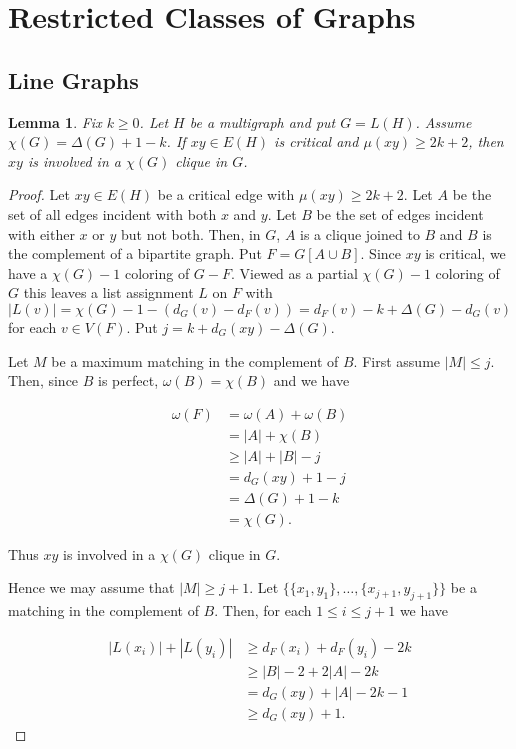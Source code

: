 \documentclass[12pt]{article}
\theoremstyle{plain}
\newtheorem{lem}[thm]{Lemma}
\theoremstyle{definition}
\theoremstyle{remark}
\begin{document}
\section{Restricted Classes of Graphs}
\subsection{Line Graphs}
\begin{lem}\label{muBoundLemma}
Fix $k \geq 0$. Let $H$ be a multigraph and put $G = L(H)$.  Assume $\chi(G) = \Delta(G) + 1 - k$. If $xy \in E(H)$ is critical and $\mu(xy) \geq 2k + 2$, then $xy$ is involved in a $\chi(G)$ clique in $G$.
\end{lem}
\begin{proof}
Let $xy \in E(H)$ be a critical edge with $\mu(xy) \geq 2k + 2$.  Let $A$ be the set of all edges incident with both $x$ and $y$.  Let $B$ be the set of edges incident with either $x$ or $y$ but not both.  Then, in $G$, $A$ is a clique joined to $B$ and $B$ is the complement of a bipartite graph.  Put $F = G[A \cup B]$.  Since $xy$ is critical, we have a $\chi(G) - 1$ coloring of $G - F$.  Viewed as a partial $\chi(G) - 1$ coloring of $G$ this leaves a list assignment $L$ on $F$ with 
$|L(v)| = \chi(G) - 1 - (d_G(v) - d_F(v)) = d_F(v) - k + \Delta(G) - d_G(v)$ for each $v \in V(F)$.  Put $j = k + d_G(xy) - \Delta(G)$. \newline

Let $M$ be a maximum matching in the complement of $B$.  First assume $|M| \leq j$.  Then, since $B$ is perfect, $\omega(B) = \chi(B)$ and we have

\begin{align*}
\omega(F) &= \omega(A) + \omega(B) \\ 
&= |A| + \chi(B) \\
&\geq |A| + |B| - j \\
&= d_G(xy) + 1 - j \\
&= \Delta(G) + 1 - k \\
&= \chi(G).
\end{align*}

Thus $xy$ is involved in a $\chi(G)$ clique in $G$.\newline

Hence we may assume that $|M| \geq j + 1$.  Let $\{\{x_1, y_1\}, \ldots, \{x_{j+1}, y_{j+1}\}\}$ be a matching in the complement of $B$.  Then, for each $1 \leq i \leq j + 1$ we have

\begin{align*}
|L(x_i)| + |L(y_i)| &\geq d_F(x_i) + d_F(y_i) - 2k \\
&\geq |B| - 2 + 2|A| - 2k \\
&= d_G(xy) + |A| - 2k - 1 \\
&\geq d_G(xy) + 1.
\end{align*}


\end{proof}
\end{document}
